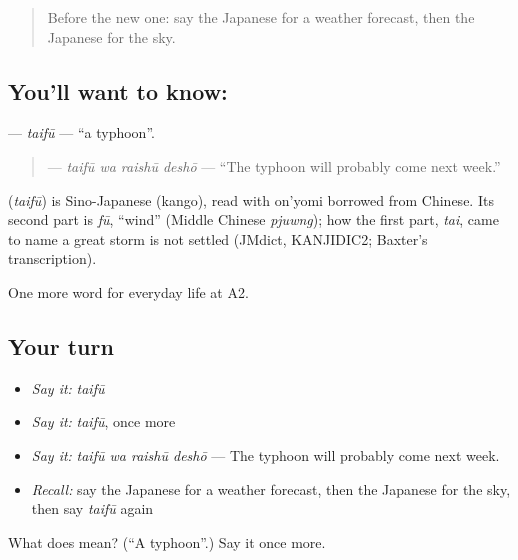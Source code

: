 \label{lesson:JA-C208-taifuu}



\begin{quote}
Before the new one: say the Japanese for a weather forecast, then the Japanese for the sky.
\end{quote}

\subsection*{You'll want to know: }
\textbf{} — \emph{taifū} — \textquotedblleft{}a typhoon\textquotedblright{}.

\begin{quote}
\textbf{ } — \emph{taifū wa raishū deshō} — \textquotedblleft{}The typhoon will probably come next week.\textquotedblright{}
\end{quote}

\begin{cousinweb}
\textbf{} (\emph{taifū}) is Sino-Japanese (kango), read with on'yomi borrowed from Chinese. Its second part is \emph{fū}, \textquotedblleft{}wind\textquotedblright{} (Middle Chinese \emph{pjuwng}); how the first part, \emph{tai}, came to name a great storm is not settled (JMdict, KANJIDIC2; Baxter's transcription).
\end{cousinweb}

\begin{grammarlens}[title={What you've built}]
One more word for everyday life at A2.
\end{grammarlens}

\subsection*{Your turn}
\begin{itemize}
\raggedright
  \item \emph{Say it:} \emph{taifū}
  \item \emph{Say it:} \emph{taifū}, once more
  \item \emph{Say it:} \emph{taifū wa raishū deshō} — The typhoon will probably come next week.
  \item \emph{Recall:} say the Japanese for a weather forecast, then the Japanese for the sky, then say \emph{taifū} again
\end{itemize}

\begin{tcolorbox}[breakable,colback=teal!4,colframe=teal!35!black,title={Before you move on}]
What does  mean? (\textquotedblleft{}A typhoon\textquotedblright{}.) Say it once more.
\end{tcolorbox}
